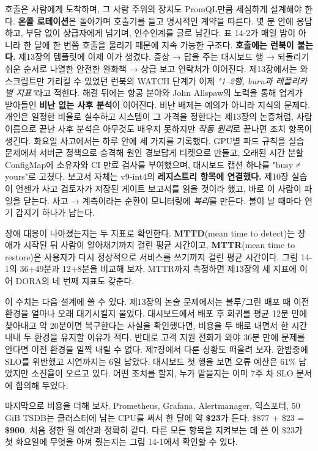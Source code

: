 호출은 사람에게 도착하며, 그 사람 주위의 장치도 PromQL만큼 세심하게 설계해야 한다. \textbf{온콜 로테이션}은 돌아가며 호출기를 들고 명시적인 계약을 따른다. 몇 분 안에 응답하고, 부담 없이 상급자에게 넘기며, 인수인계를 글로 남긴다. 표 14-2가 매일 밤이 아니라 한 달에 한 번쯤 호출을 울리기 때문에 지속 가능한 구조다. \textbf{호출에는 런북이 붙는다.} 제13장의 템플릿에 이제 이가 생겼다. 증상 → 답을 주는 대시보드 행 → 되돌리기 쉬운 순서로 나열한 안전한 완화책 → 상급 보고 연락처가 이어진다. 제13장에서는 와 스크립트만 가리킬 수 있었던 런북의 WATCH 단계가 이제 \textit{"1–2행, burn과 레플리카별 지표"}라고 적힌다. 해결 뒤에는 항공 분야와 John Allspaw의 노력을 통해 업계가 받아들인 \textbf{비난 없는 사후 분석}이 이어진다. 비난 배제는 예의가 아니라 지식의 문제다. 개인은 일정한 비율로 실수하고 시스템이 그 가격을 정한다는 제13장의 논증처럼, 사람 이름으로 끝난 사후 분석은 아무것도 배우지 못하지만 \textit{작동 원리}로 끝나면 조치 항목이 생긴다. 화요일 사고에서는 하루 안에 세 가지를 기록했다. GPU별 파드 규칙을 실습 문제에서 서버군 정책으로 승격해 원인 경보답게 티켓으로 만들고, 오래된 시간 분할 ConfigMap에 소유자와 CI 만료 검사를 부여했으며, 대시보드 캡션 하나를 "busy ≠ yours"로 고쳤다. 보고서 자체는 v9-int4의 \textbf{레지스트리 항목에 연결했다.} 제10장 실습이 언젠가 사고 검토자가 저장된 게이트 보고서를 읽을 것이라 했고, 바로 이 사람이 파일을 닫는다. 사고 → 계측이라는 순환이 모니터링에 \textit{복리}를 만든다. 불이 날 때마다 연기 감지기 하나가 남는다.

장애 대응이 나아졌는지는 두 지표로 확인한다. \textbf{MTTD}(mean time to detect)는 장애가 시작된 뒤 사람이 알아채기까지 걸린 평균 시간이고, \textbf{MTTR}(mean time to restore)은 사용자가 다시 정상적으로 서비스를 쓰기까지 걸린 평균 시간이다. 그림 14-1의 36+49분과 12+8분을 비교해 보자. MTTR까지 측정하면 제13장의 세 지표에 이어 DORA의 네 번째 지표도 갖춘다.

이 수치는 다음 설계에 쓸 수 있다. 제13장의 논술 문제에서는 블루/그린 배포 때 이전 환경을 얼마나 오래 대기시킬지 물었다. 대시보드에서 배포 후 회귀를 평균 12분 만에 찾아내고 약 20분이면 복구한다는 사실을 확인했다면, 비용을 두 배로 내면서 한 시간 내내 두 환경을 유지할 이유가 적다. 반대로 고객 지원 전화가 와야 36분 만에 문제를 안다면 이전 환경을 일찍 내릴 수 없다. 제7장에서 다룬 상황도 떠올려 보자. 한밤중에 SLO를 위반했고 시연까지는 6일 남았다. 대시보드 첫 행을 보면 오류 예산은 61\% 남았지만 소진율이 오르고 있다. 어떤 조치를 할지, 누가 맡을지는 이미 7주 차 SLO 문서에 합의해 두었다.

마지막으로 비용을 더해 보자. Prometheus, Grafana, Alertmanager, 익스포터, 50 GiB TSDB는 클러스터에 남는 CPU를 써서 한 달에 약 \textbf{\$23}가 든다. \$877 + \$23 = \textbf{\$900}, 처음 정한 월 예산과 정확히 같다. 다른 모든 항목을 지켜보는 데 쓴 이 \$23가 첫 화요일에 무엇을 아껴 줬는지는 그림 14-1에서 확인할 수 있다.

